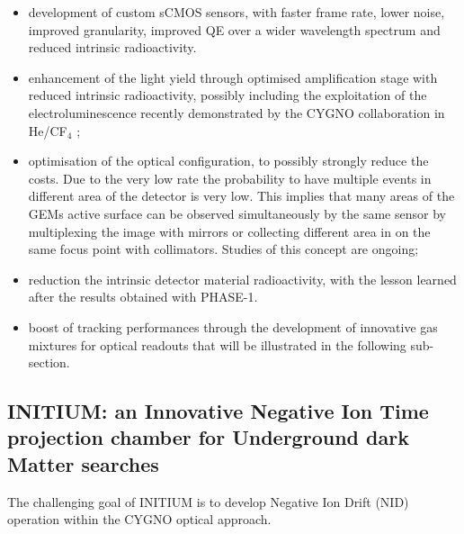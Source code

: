 \documentclass[physics,article,submit,moreauthors,pdftex]{Definitions/mdpi}
\begin{document}
\begin{itemize}
\item development of custom sCMOS sensors, with faster frame rate, lower noise, improved granularity, improved QE over a wider wavelength spectrum and reduced intrinsic radioactivity. 
\item enhancement of the light yield through optimised amplification stage with reduced intrinsic radioactivity, possibly including the exploitation of the electroluminescence recently demonstrated by the CYGNO collaboration in He/CF$_4$ \cite{Baracchini:2020dib}; 
\item optimisation of the optical configuration, to possibly strongly reduce the costs. Due to the very low rate the probability to have multiple events in different area of the detector is very low. This implies that many areas of the GEMs active surface can be observed simultaneously by the same sensor by multiplexing the image with  mirrors or collecting different area in on the same focus point with collimators. Studies of this concept are ongoing;
\item reduction the intrinsic detector material radioactivity, with the lesson learned after the results obtained with PHASE-1.
\item boost of tracking performances through the development of innovative gas mixtures for optical readouts that will be illustrated in the following sub-section.
\end{itemize}



\subsection{INITIUM: an Innovative Negative Ion Time projection chamber for Underground dark Matter searches}

The challenging goal of INITIUM is to develop Negative Ion Drift (NID) operation within the CYGNO optical approach. 
\end{document}
